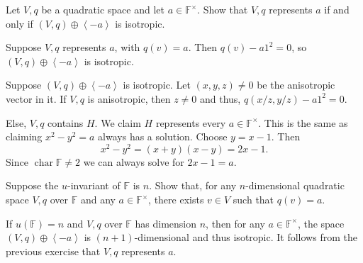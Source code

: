 \documentclass[12 pt, letterpaper]{hmcpset}
\begin{document}
\pagebreak

\begin{problem}[(5)]
	Let $V, q$ be a quadratic space and let $a \in \mathbb{F}^{\times}$. Show that $V, q$ represents $a$ if and only if  $(V, q) \oplus \left < -a \right >$ is isotropic.
\end{problem}

\begin{solution}
	Suppose $V, q$ represents $a$, with $q(v) = a$. Then $q(v) - a 1^{2} = 0$, so $(V, q) \oplus \left < -a \right >$ is isotropic.

	Suppose $(V, q) \oplus \left < -a \right >$ is isotropic. Let $(x, y, z) \neq 0$ be the anisotropic vector in it. If $V, q$ is anisotropic, then $z \neq 0$ and thus, $q(x / z, y / z) - a 1^{2} = 0$.

	Else, $V, q$ contains $H$. We claim $H$ represents every $a \in \mathbb{F}^{\times}$. This is the same as claiming $x^{2} - y^{2} = a$ always has a solution. Choose $y = x - 1$. Then
	 \[
		x^{2} - y^{2} = (x + y)(x - y) = 2x - 1.
	\]
	Since $\operatorname{char} \mathbb{F} \neq 2$ we can always solve for $2x - 1 = a$.
\end{solution}

\pagebreak

\begin{problem}[(6)]
	Suppose the $u$-invariant of $\mathbb{F}$ is $n$. Show that, for any $n$-dimensional quadratic space $V, q$ over $\mathbb{F}$ and any $a \in \mathbb{F}^{\times}$, there exists $v \in V$ such that $q(v) = a$.
\end{problem}

\begin{solution}
	If $u(\mathbb{F}) = n$ and $V, q$ over $\mathbb{F}$ has dimension $n$, then for any $a \in \mathbb{F}^{\times}$, the space $(V, q) \oplus \left < -a \right >$ is $(n + 1)$-dimensional and thus isotropic. It follows from the previous exercise that $V, q$ represents $a$.
\end{solution}

\pagebreak

\end{document}
